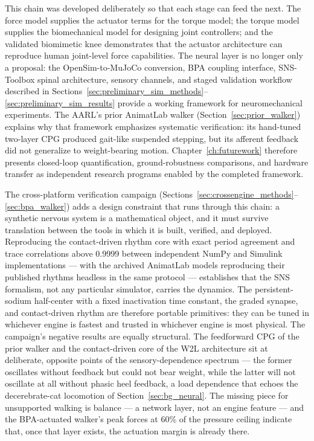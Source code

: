 This chain was developed deliberately so that each stage can feed the next. The force model supplies the actuator terms for the torque model; the torque model supplies the biomechanical model for designing joint controllers; and the validated biomimetic knee demonstrates that the actuator architecture can reproduce human joint-level force capabilities. The neural layer is no longer only a proposal: the OpenSim-to-MuJoCo conversion, BPA coupling interface, SNS-Toolbox spinal architecture, sensory channels, and staged validation workflow described in Sections~\ref{sec:preliminary_sim_methods}--\ref{sec:preliminary_sim_results} provide a working framework for neuromechanical experiments. The AARL's prior AnimatLab walker (Section~\ref{sec:prior_walker}) explains why that framework emphasizes systematic verification: its hand-tuned two-layer CPG produced gait-like suspended stepping, but its afferent feedback did not generalize to weight-bearing motion. Chapter~\ref{ch:futurework} therefore presents closed-loop quantification, ground-robustness comparisons, and hardware transfer as independent research programs enabled by the completed framework.

The cross-platform verification campaign (Sections~\ref{sec:crossengine_methods}--\ref{sec:bpa_walker}) adds a design constraint that runs through this chain: a synthetic nervous system is a mathematical object, and it must survive translation between the tools in which it is built, verified, and deployed. Reproducing the contact-driven rhythm core with exact period agreement and trace correlations above 0.9999 between independent NumPy and Simulink implementations --- with the archived AnimatLab models reproducing their published rhythms headless in the same protocol --- establishes that the SNS formalism, not any particular simulator, carries the dynamics. The persistent-sodium half-center with a fixed inactivation time constant, the graded synapse, and contact-driven rhythm are therefore portable primitives: they can be tuned in whichever engine is fastest and trusted in whichever engine is most physical. The campaign's negative results are equally structural. The feedforward CPG of the prior walker and the contact-driven core of the W2L architecture sit at deliberate, opposite points of the sensory-dependence spectrum --- the former oscillates without feedback but could not bear weight, while the latter will not oscillate at all without phasic heel feedback, a load dependence that echoes the decerebrate-cat locomotion of Section~\ref{sec:bg_neural}. The missing piece for unsupported walking is balance --- a network layer, not an engine feature --- and the BPA-actuated walker's peak forces at 60\% of the pressure ceiling indicate that, once that layer exists, the actuation margin is already there.

